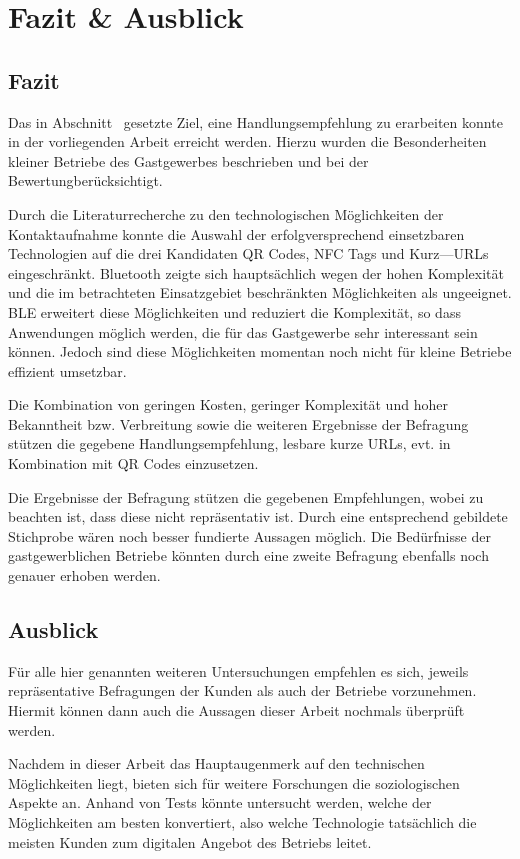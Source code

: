 \section{Fazit \& Ausblick}

\subsection{Fazit}
Das in Abschnitt~ gesetzte Ziel, eine Handlungsempfehlung zu erarbeiten konnte in der vorliegenden Arbeit erreicht werden. Hierzu wurden die Besonderheiten kleiner Betriebe des Gastgewerbes beschrieben und bei der Bewertungberücksichtigt.

Durch die Literaturrecherche zu den technologischen Möglichkeiten der Kontaktaufnahme konnte die Auswahl der erfolgversprechend einsetzbaren Technologien auf die drei Kandidaten QR Codes, NFC Tags und Kurz—URLs eingeschränkt. Bluetooth zeigte sich hauptsächlich wegen der hohen Komplexität und die im betrachteten Einsatzgebiet beschränkten Möglichkeiten als ungeeignet. \ac{BLE} erweitert diese Möglichkeiten und reduziert die Komplexität, so dass Anwendungen möglich werden, die für das Gastgewerbe sehr interessant sein können. Jedoch sind diese Möglichkeiten momentan noch nicht für kleine Betriebe effizient umsetzbar.

Die Kombination von geringen Kosten, geringer Komplexität und hoher Bekanntheit bzw. Verbreitung sowie die weiteren Ergebnisse der Befragung stützen die gegebene Handlungsempfehlung, lesbare kurze \ac{URL}s, evt. in Kombination mit QR Codes einzusetzen.

Die Ergebnisse der Befragung stützen die gegebenen Empfehlungen, wobei zu beachten ist, dass diese nicht repräsentativ ist. Durch eine entsprechend gebildete Stichprobe wären noch besser fundierte Aussagen möglich. Die Bedürfnisse der gastgewerblichen Betriebe könnten durch eine zweite Befragung ebenfalls noch genauer erhoben werden.

\subsection{Ausblick}

Für alle hier genannten weiteren Untersuchungen empfehlen es sich, jeweils repräsentative Befragungen der Kunden als auch der Betriebe vorzunehmen. Hiermit können dann auch die Aussagen dieser Arbeit nochmals überprüft werden.

Nachdem in dieser Arbeit das Hauptaugenmerk auf den technischen Möglichkeiten liegt, bieten sich für weitere Forschungen die soziologischen Aspekte an. Anhand von Tests könnte untersucht werden, welche der Möglichkeiten am besten konvertiert, also welche Technologie tatsächlich die meisten Kunden zum digitalen Angebot des Betriebs leitet.

